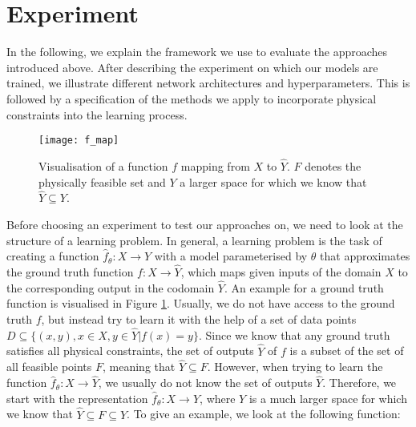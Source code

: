 \section{Experiment}
\label{section:experiment}
In the following, we explain the framework we use to evaluate the approaches introduced above. After describing the experiment on which our models are trained, we illustrate different network architectures and hyperparameters. This is followed by a specification of the methods we apply to incorporate physical constraints into the learning process. 
\begin{figure}[H]
	\texttt{[image: f\_map]}
	\caption{Visualisation of a function $f$ mapping from $X$ to $\hat{Y}$. $F$ denotes the physically feasible set and $Y$ a larger space for which we know that $\hat{Y} \subseteq Y$.}
	\label{fig:f_map}
\end{figure}
Before choosing an experiment to test our approaches on, we need to look at the structure of a learning problem. 
In general, a learning problem is the task of creating a function $\hat{f}_\theta: X \to Y$ with a model parameterised by $\theta$ that approximates the ground truth function $f: X \to \hat{Y}$, which maps given inputs of the domain $X$ to the corresponding output in the codomain $\hat{Y}$. An example for a ground truth function is visualised in Figure \ref{fig:f_map}. Usually, we do not have access to the ground truth $f$, but instead try to learn it with the help of a set of data points $D \subseteq \{(x, y), x \in X, y \in \hat{Y} | f(x) = y\}$. Since we know that any ground truth satisfies all physical constraints, the set of outputs $\hat{Y}$ of $f$ is a subset of the set of all feasible points $F$, meaning that $\hat{Y} \subseteq F$. However, when trying to learn the function $\hat{f}_\theta: X \to \hat{Y}$, we usually do not know the set of outputs $\hat{Y}$. Therefore, we start with the representation $\hat{f}_\theta: X \to Y$, where $Y$ is a much larger space for which we know that $\hat{Y} \subseteq F \subseteq Y$. To give an example, we look at the following function:

